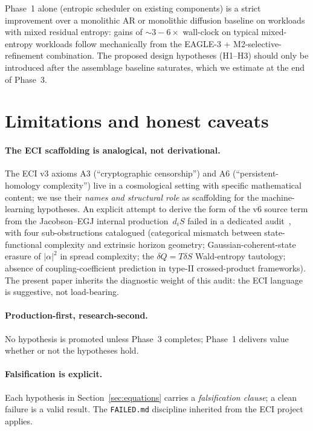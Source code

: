 \documentclass[10pt,a4paper]{article}
\theoremstyle{remark}
\begin{document}
Phase~1 alone (entropic scheduler on existing components) is a
strict improvement over a monolithic AR or monolithic diffusion
baseline on workloads with mixed residual entropy: gains of
$\sim 3\!-\!6\times$ wall-clock on typical mixed-entropy workloads
follow mechanically from the EAGLE-3 +
M2-selective-refinement combination. The proposed design hypotheses
(H1--H3) should only be introduced after the assemblage baseline
saturates, which we estimate at the end of Phase~3.

\section{Limitations and honest caveats}
\label{sec:caveats}

\paragraph{The ECI scaffolding is analogical, not derivational.}
The ECI v3 axioms A3 (``cryptographic censorship'') and A6
(``persistent-homology complexity'') live in a cosmological
setting with specific mathematical content; we use their
\emph{names and structural role} as scaffolding for the
machine-learning hypotheses. An explicit attempt to derive the
form of the v6 source term from the Jacobson--EGJ internal
production~$d_i S$ failed in a dedicated audit~\cite{ECIv6Audit},
with four sub-obstructions catalogued
(categorical mismatch between state-functional complexity and
extrinsic horizon geometry; Gaussian-coherent-state erasure of
$|\alpha|^2$ in spread complexity; the $\delta Q = T \delta S$
Wald-entropy tautology; absence of coupling-coefficient prediction
in type-II crossed-product frameworks). The present paper inherits
the diagnostic weight of this audit: the ECI language is
suggestive, not load-bearing.

\paragraph{Production-first, research-second.}
No hypothesis is promoted unless Phase~3 completes; Phase~1 delivers
value whether or not the hypotheses hold.

\paragraph{Falsification is explicit.}
Each hypothesis in Section~\ref{sec:equations} carries a
\emph{falsification clause}; a clean failure is a valid result. The
\texttt{FAILED.md} discipline inherited from the ECI project
applies.
\end{document}
